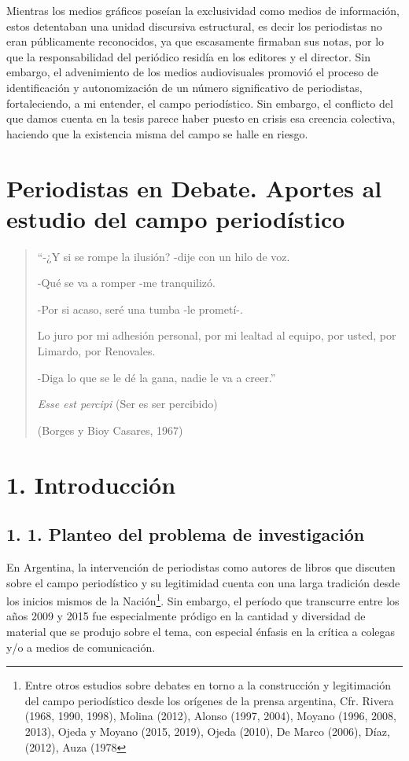Mientras los medios gráficos poseían la exclusividad como medios de información, estos detentaban una unidad discursiva estructural, es decir los periodistas no eran públicamente reconocidos, ya que escasamente firmaban sus notas, por lo que la responsabilidad del periódico residía en los editores y el director. Sin embargo, el advenimiento de los medios audiovisuales promovió el proceso de identificación y autonomización de un número significativo de periodistas, fortaleciendo, a mi entender, el campo periodístico. Sin embargo, el conflicto del que damos cuenta en la tesis parece haber puesto en crisis esa creencia colectiva, haciendo que la existencia misma del campo se halle en riesgo.

\mainmatter

\chapter{Periodistas en Debate. Aportes al estudio del campo periodístico}

\begin{quote}
``-¿Y si se rompe la ilusión? -dije con un hilo de voz.

-Qué se va a romper -me tranquilizó.

-Por si acaso, seré una tumba -le prometí-.

Lo juro por mi adhesión personal, por mi lealtad al equipo, por usted, por Limardo, por Renovales.

-Diga lo que se le dé la gana, nadie le va a creer.''

\emph{Esse est percipi} (Ser es ser percibido)

(Borges y Bioy Casares, 1967)
\end{quote}

\chapter{1. Introducción}

\section{1. 1. Planteo del problema de investigación}

En Argentina, la intervención de periodistas como autores de libros que discuten sobre el campo periodístico y su legitimidad cuenta con una larga tradición desde los inicios mismos de la Nación\footnote{Entre otros estudios sobre debates en torno a la construcción y legitimación del campo periodístico desde los orígenes de la prensa argentina, Cfr. Rivera (1968, 1990, 1998), Molina (2012), Alonso (1997, 2004), Moyano (1996, 2008, 2013), Ojeda y Moyano (2015, 2019), Ojeda (2010), De Marco (2006), Díaz, (2012), Auza (1978}. Sin embargo, el período que transcurre entre los años 2009 y 2015 fue especialmente pródigo en la cantidad y diversidad de material que se produjo sobre el tema, con especial énfasis en la crítica a colegas y/o a medios de comunicación.

